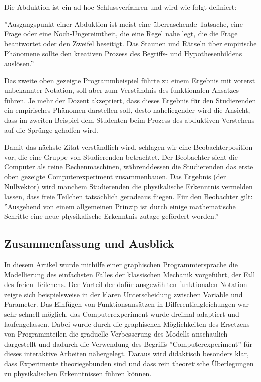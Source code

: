 \documentclass[twocolumn, 10pt]{article}
\begin{document}
Die Abduktion ist ein ad hoc Schlussverfahren und wird wie folgt definiert:

''Ausgangspunkt einer Abduktion ist meist eine überraschende Tatsache, eine Frage oder eine Noch-Ungereimtheit, die eine Regel nahe legt, die die Frage beantwortet oder den Zweifel beseitigt. Das Staunen und Rätseln über empirische Phänomene sollte den kreativen Prozess des Begriffs- und Hypothesenbildens auslösen.''

Das zweite oben gezeigte Programmbeispiel führte zu einem Ergebnis mit vorerst unbekannter Notation, soll aber zum Verständnis des funktionalen Ansatzes führen. Je mehr der Dozent akzeptiert, dass dieses Ergebnis für den Studierenden ein empirisches Phänomen darstellen soll, desto naheliegender wird die Ansicht, dass im zweiten Beispiel dem Studenten beim Prozess des abduktiven Verstehens auf die Sprünge geholfen wird.

Damit das nächste Zitat verständlich wird, schlagen wir eine Beobachterposition vor, die eine Gruppe von Studierenden betrachtet. Der Beobachter sieht die Computer als reine Rechenmaschinen, währenddessen die Studierenden das erste oben gezeigte Computerexperiment zusammenbauen. Das Ergebnis (der Nullvektor) wird manchem Studierenden die physikalische Erkenntnis vermelden lassen, dass freie Teilchen tatsächlich geradeaus fliegen. Für den Beobachter gilt:
''Ausgehend von einem allgemeinen Prinzip ist durch einige mathematische Schritte eine neue physikalische Erkenntnis zutage gefördert worden.''

\subsection{Zusammenfassung und Ausblick}
In diesem Artikel wurde mithilfe einer graphischen Programmiersprache die Modellierung des einfachsten Falles der klassischen Mechanik vorgeführt, der Fall des freien Teilchens.  Der Vorteil der dafür ausgewählten funktionalen Notation zeigte sich beispielsweise in der klaren Unterscheidung zwischen Variable und Parameter. Das Einfügen von Funktionsansätzen in Differentialgleichungen war sehr schnell möglich, das Computerexperiment wurde dreimal adaptiert und laufengelassen. Dabei wurde durch die graphischen Möglichkeiten des Ersetzens von Programmteilen die graduelle Verbesserung des Modells anschaulich dargestellt und dadurch die Verwendung des Begriffs ''Computerexperiment'' für dieses interaktive Arbeiten nähergelegt. Daraus wird didaktisch besonders klar, dass Experimente theoriegebunden sind und dass rein theoretische Überlegungen zu physikalischen Erkenntnissen führen können.
\end{document}
